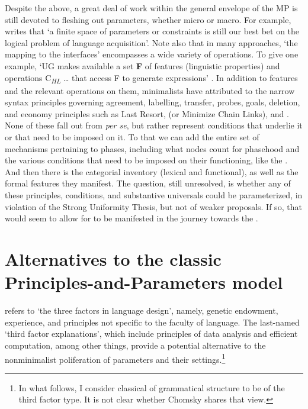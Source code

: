 \documentclass[output=paper,
modfonts
]{LSP/langsci}
\begin{document}
Despite the above, a great deal of work within the general envelope of
the MP is still devoted to fleshing out parameters, whether micro or
macro. For example, \citet[202--203]{yang2011n} writes that `a finite space of
parameters or constraints is still our best bet on the logical problem
of language acquisition'. Note also that in many approaches, `the
mapping to the interfaces' encompasses a wide variety of operations. To
give one example, `UG makes available a set \textbf{F} of features
(linguistic properties) and operations C\emph{\textsubscript{HL}}
\ldots{} that access F to generate expressions' \citep[100]{chomsky2000}. In
addition to features and the relevant operations on them, minimalists
have attributed to the narrow syntax principles governing agreement,
labelling, transfer, probes, goals, deletion, and economy principles
such as Last Resort,  (or Minimize Chain Links),
and . None of these fall out from  \emph{per se}, but
rather represent conditions that underlie it or that need to be imposed
on it. To that we can add the entire set of mechanisms pertaining to
phases, including what nodes count for phasehood and the various
conditions that need to be imposed on their functioning, like the . And then there is the categorial inventory
(lexical and functional), as well as the formal features they manifest.
The question, still unresolved, is whether any of these principles,
conditions, and substantive universals could be parameterized, in
violation of the Strong Uniformity Thesis, but not of weaker proposals.
If so, that would seem to allow for  to be
manifested in the journey towards the .

\section{Alternatives to the classic Principles-and-Parameters model}

\citet{chomsky2005} refers to `the three factors in language design', namely,
genetic endowment, experience, and principles not specific to the
faculty of language. The last-named `third factor explanations', which
include principles of data analysis and efficient computation, among
other things, provide a potential alternative to the nonminimalist
poliferation of parameters and their settings.\footnote{In what follows,
  I consider classical  of grammatical structure
  to be of the third factor type. It is not clear whether Chomsky shares
  that view.}
\end{document}
